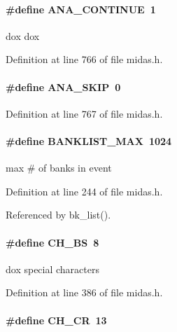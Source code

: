 \paragraph[{ANA\_\-CONTINUE}]{\setlength{\rightskip}{0pt plus 5cm}\#define ANA\_\-CONTINUE~1}\hfill\label{group__midasincludecode_ga5047333a47cabd84504052d921f5e82d}
dox dox 

Definition at line 766 of file midas.h.
\paragraph[{ANA\_\-SKIP}]{\setlength{\rightskip}{0pt plus 5cm}\#define ANA\_\-SKIP~0}\hfill\label{group__midasincludecode_ga0ab5be4c0e2780166a0b7ed977fe3f01}


Definition at line 767 of file midas.h.
\paragraph[{BANKLIST\_\-MAX}]{\setlength{\rightskip}{0pt plus 5cm}\#define BANKLIST\_\-MAX~1024}\hfill\label{group__midasincludecode_gaab64ba61449c513d2c3a2f4884a38d06}
max \# of banks in event 

Definition at line 244 of file midas.h.

Referenced by bk\_\-list().
\paragraph[{CH\_\-BS}]{\setlength{\rightskip}{0pt plus 5cm}\#define CH\_\-BS~8}\hfill\label{group__midasincludecode_gaf5ec05509b0e59d4796795063e6c01d3}
dox special characters 

Definition at line 386 of file midas.h.
\paragraph[{CH\_\-CR}]{\setlength{\rightskip}{0pt plus 5cm}\#define CH\_\-CR~13}\hfill\label{group__midasincludecode_ga8bfc2021af2e7e6fbf2228a180d815a9}



